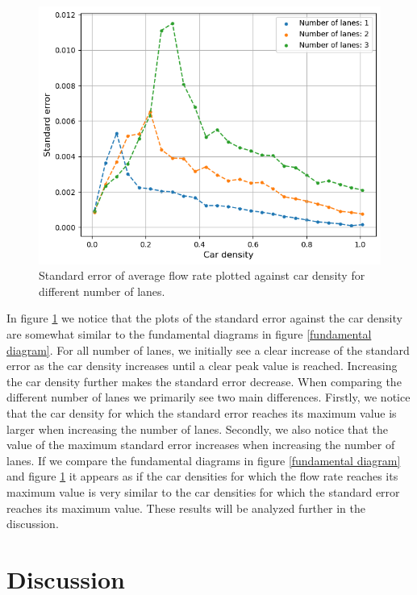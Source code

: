 \documentclass[a4paper,12pt]{article}
\begin{document}
\begin{figure}[H]
    \centering
    \includegraphics[scale=0.9]{Images/standard error 120.png}
    \caption{Standard error of average flow rate plotted against car density for different number of lanes.}
    \label{standard error}
\end{figure}

In figure \ref*{standard error} we notice that the plots of the standard error against the car density are somewhat similar to the fundamental diagrams
in figure \ref*{fundamental diagram}. For all number of lanes, we initially see a clear increase of the standard error as the car density increases
until a clear peak value is reached. Increasing the car density further makes the standard error decrease. When comparing the different number of lanes we primarily
see two main differences. Firstly, we notice that the car density for which the standard error reaches its maximum value is larger when increasing the number of lanes.
Secondly, we also notice that the value of the maximum standard error increases when increasing the number of lanes. If we compare the fundamental
diagrams in figure \ref*{fundamental diagram} and figure \ref*{standard error} it appears as if the car densities for which the flow rate reaches its maximum
value is very similar to the car densities for which the standard error reaches its maximum value. These results will be analyzed further in the discussion.

\section*{Discussion}
\end{document}

